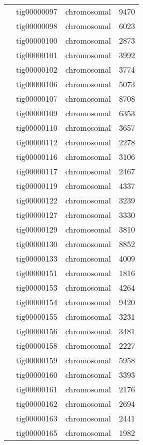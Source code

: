 {\begin{supertabular}{llcr}
         & tig00000097 & chromosomal & 9470 \\
         & tig00000098 & chromosomal & 6023 \\
         & tig00000100 & chromosomal & 2873 \\
         & tig00000101 & chromosomal & 3992 \\
         & tig00000102 & chromosomal & 3774 \\
         & tig00000106 & chromosomal & 5073 \\
         & tig00000107 & chromosomal & 8708 \\
         & tig00000109 & chromosomal & 6353 \\
         & tig00000110 & chromosomal & 3657 \\
         & tig00000112 & chromosomal & 2278 \\
         & tig00000116 & chromosomal & 3106 \\
         & tig00000117 & chromosomal & 2467 \\
         & tig00000119 & chromosomal & 4337 \\
         & tig00000122 & chromosomal & 3239 \\
         & tig00000127 & chromosomal & 3330 \\
         & tig00000129 & chromosomal & 3810 \\
         & tig00000130 & chromosomal & 8852 \\
         & tig00000133 & chromosomal & 4009 \\
         & tig00000151 & chromosomal & 1816 \\
         & tig00000153 & chromosomal & 4264 \\
         & tig00000154 & chromosomal & 9420 \\
         & tig00000155 & chromosomal & 3231 \\
         & tig00000156 & chromosomal & 3481 \\
         & tig00000158 & chromosomal & 2227 \\
         & tig00000159 & chromosomal & 5958 \\
         & tig00000160 & chromosomal & 3393 \\
         & tig00000161 & chromosomal & 2176 \\
         & tig00000162 & chromosomal & 2694 \\
         & tig00000163 & chromosomal & 2441 \\
         & tig00000165 & chromosomal & 1982 \\

\end{supertabular}}
